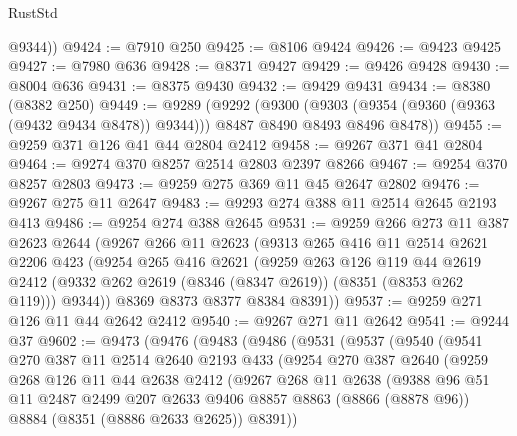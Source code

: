 \begin{lexlean}{RustStd}
\begin{coremodule}
{\begin{coremodule}
{{{{{{{{{{{{{{{{{{{{{{{{{{{{{{{{{{{{{{{{{{{{{{{{{{        @9344))
@9424 := @7910 @250
@9425 := @8106 @9424
@9426 := @9423 @9425
@9427 := @7980 @636
@9428 := @8371 @9427
@9429 := @9426 @9428
@9430 := @8004 @636
@9431 := @8375 @9430
@9432 := @9429 @9431
@9434 := @8380 (@8382 @250)
@9449 := @9289
    (@9292
      (@9300
        (@9303 (@9354 (@9360 (@9363 (@9432 @9434 @8478)) @9344)))
        @8487
        @8490
        @8493
        @8496
        @8478))
@9455 := @9259 @371 @126 @41 @44 @2804 @2412
@9458 := @9267 @371 @41 @2804
@9464 := @9274 @370 @8257 @2514 @2803 @2397 @8266
@9467 := @9254 @370 @8257 @2803
@9473 := @9259 @275 @369 @11 @45 @2647 @2802
@9476 := @9267 @275 @11 @2647
@9483 := @9293 @274 @388 @11 @2514 @2645 @2193 @413
@9486 := @9254 @274 @388 @2645
@9531 := @9259
    @266
    @273
    @11
    @387
    @2623
    @2644
    (@9267
      @266
      @11
      @2623
      (@9313
        @265
        @416
        @11
        @2514
        @2621
        @2206
        @423
        (@9254
          @265
          @416
          @2621
          (@9259
            @263
            @126
            @119
            @44
            @2619
            @2412
            (@9332 @262 @2619 (@8346 (@8347 @2619)) (@8351 (@8353 @262 @119)))
            @9344))
        @8369
        @8373
        @8377
        @8384
        @8391))
@9537 := @9259 @271 @126 @11 @44 @2642 @2412
@9540 := @9267 @271 @11 @2642
@9541 := @9244 @37
@9602 := @9473
    (@9476
      (@9483
        (@9486
          (@9531
            (@9537
              (@9540
                (@9541
                  @270
                  @387
                  @11
                  @2514
                  @2640
                  @2193
                  @433
                  (@9254
                    @270
                    @387
                    @2640
                    (@9259
                      @268
                      @126
                      @11
                      @44
                      @2638
                      @2412
                      (@9267
                        @268
                        @11
                        @2638
                        (@9388
                          @96
                          @51
                          @11
                          @2487
                          @2499
                          @207
                          @2633
                          @9406
                          @8857
                          @8863
                          (@8866 (@8878 @96))
                          @8884
                          (@8351 (@8886 @2633 @2625))
                          @8391))
}}}}}}}}}}}}}}}}}}}}}}}}}}}}}}}}}}}}}}}}}}}}}}}}}}
\end{coremodule}}
\end{coremodule}
\end{lexlean}
